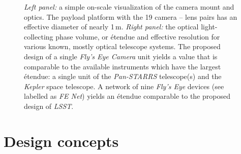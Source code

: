 \documentclass[11pt,twoside]{article}
\begin{document}
\begin{figure}
\begin{center}
\resizebox{60mm}{!}{\texttt{[image: O09\_f1]}}%
\end{center}
\caption{%
{\it Left panel:} a simple on-scale visualization of the camera 
mount and optics. The payload platform with the 19 camera -- lens pairs has
an effective diameter of nearly 1\,m. 
{\it Right panel:} the optical light-collecting phase volume, 
or \'etendue and effective resolution for various known,
mostly optical telescope systems. 
The proposed design of a single {\it Fly's Eye Camera} unit yields a value that 
is comparable to the available 
instruments which have the largest \'etendue: a single unit
of the \emph{Pan-STARRS} telescope(s) and 
the \emph{Kepler} space telescope. A network of nine {\it Fly's Eye} devices
(see labelled as {\it FE Net}) yields an \'etendue comparable to 
the proposed design of \emph{LSST}.}
\label{fig:flyseye}
\end{figure}

\section{Design concepts}
\end{document}
